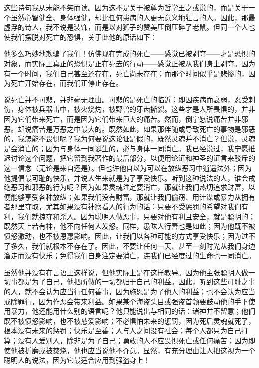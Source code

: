 \par

这些诗句我从未能不笑而读。因为这不是关于被尊为哲学王之或说的，而是关于一个虽然心智健全、身体强健，却比任何患病的人更无意义地狂言的人。因此，那最虚浮的诗人，我不说是装饰，而是以对狮子的赞美压倒压碎了老鼠。但同一个人也使我们摆脱对死亡的恐惧，关于此他的原话如下：\par

\par

他多么巧妙地欺骗了我们！仿佛现在完成的死亡——感觉已被剥夺——才是恐惧的对象，而实际上真正的恐惧是正在死去的行动——感觉正被从我们身上剥夺。因为有一个时间，我们自己甚至还存在，死亡尚未存在；而那个时间似乎是悲惨的，因为死亡开始存在，而我们正停止存在。\par

说死亡并不可悲，并非毫无理由。可悲的是死亡的临近：即因疾病而衰弱，忍受刺伤，身体被兵器击中，被火烧灼，被野兽的牙齿撕裂。这些才是人所畏惧的，并非因为它们带来死亡，而是因为它们带来巨大的痛苦。然而，倒宁愿说痛苦并非邪恶。却说痛苦是万恶之中最大的。既然如此，如果那伴随或导致死亡的事物是邪恶的，我怎能不畏惧呢？我为何要说这论证是假的，既然灵魂并不消亡？但说，灵魂是会消亡的；因为与身体一同诞生的，必与身体一同消亡。我已经说过，我宁愿推迟讨论这个问题，把它留到我著作的最后部分，以便用论证和神圣的证言来驳斥的这一信念（无论是来自还是）。但也许他自以为可以在放纵恶习中逍遥法外；因为他提倡最可耻的快乐，并说人生来就是为了享受快乐。听到这种说法的人，谁会戒绝恶习和邪恶的行为呢？因为如果灵魂注定要消亡，那就让我们热切追求财富，以便能够享受各种放纵；如果我们没有财富，那就让我们偷窃、用计谋或暴力从拥有者那里夺取，尤其如果没有神察看人的行为的话：只要不受惩罚的希望对我们有利，我们就掠夺和杀人。因为聪明人做恶事，只要对他有利且安全，就是聪明的；既然天上若有神，他不向任何人发怒。同样，愚昧人行善也是如此；因为他既不被愤怒激动，也不被恩惠影响。因此，让我们以各种可能的方式享受快乐；因为过不了多久，我们就根本不存在了。因此，不要让任何一天、甚至一刻时光从我们身边溜走而没有快乐；免得我们自身注定要消亡，连我们已经度过的生命也一同消亡。\par

虽然他并没有在言语上这样说，但他实际上是在这样教导。因为他主张聪明人做一切事都是为了自己，他把所做的一切都归于自己的利益。因此，听到这些可耻之事的人，就不会认为应当行任何善事，因为施恩是为了他人的利益；也不会认为应当戒除罪行，因为作恶会带来利益。如果某个海盗头目或强盗首领要鼓动他的手下使用暴力，他还能用什么别的语言呢？他只能说出与相同的话：诸神并不留意；他们既不被愤怒影响，也不被慈爱影响；不必惧怕未来的惩罚，因为死后灵魂就死了，根本没有未来的惩罚；快乐是至善；人与人之间没有社会；每个人都只为自己打算；没有人爱别人，除非是为了自己；勇敢的人不应畏惧死亡或任何痛苦；因为即使他被折磨或被焚烧，他也应当说他不介意。显然，有充分理由让人把这视为一个聪明人的说法，因为它最适合应用到强盗身上！\par

